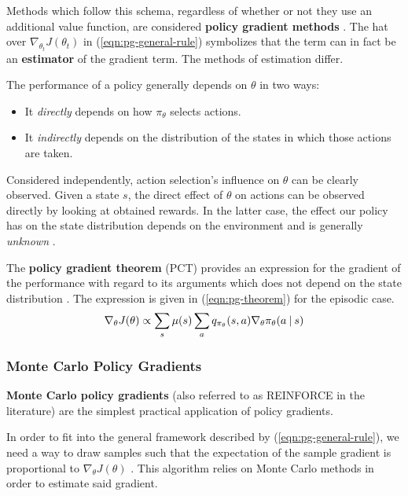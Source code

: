 Methods which follow this schema, regardless of whether or not they use an additional value function, are considered \textbf{policy gradient methods} \cite{rlai}.
The hat over $\nabla_{\theta_{t}} J(\theta_{t})$ in (\ref{eqn:pg-general-rule}) symbolizes that the term can in fact be an \textbf{estimator} of the gradient term. The methods of estimation differ.

The performance of a policy generally depends on $\theta$ in two ways:
\begin{itemize}
    \item It \emph{directly} depends on how $\pi_{\theta}$ selects actions.
    \item It \emph{indirectly} depends on the distribution of the states in which those actions are taken.
\end{itemize}
Considered independently, action selection's influence on $\theta$ can be clearly observed.
Given a state $s$, the direct effect of $\theta$ on actions can be observed directly by looking at obtained rewards.
In the latter case, the effect our policy has on the state distribution depends on the environment and is generally \emph{unknown} \cite{rlai}.

The \textbf{policy gradient theorem} (PCT) provides an expression for the gradient of the performance with regard to its arguments which does not depend on the state distribution \cite{rlai}.
The expression is given in (\ref{eqn:pg-theorem}) for the episodic case.
\begin{equation} \label{eqn:pg-theorem}
    \nabla_{\theta} J(\theta) \propto
        \sum_{s}{
            \mu(s) \sum_{a}{
                q_{\pi_{\theta}}(s, a) \nabla_{\theta} \pi_{\theta}(a \:\vert\: s)
            }
        }
\end{equation}

\subsubsection{Monte Carlo Policy Gradients}
\textbf{Monte Carlo policy gradients} (also referred to as REINFORCE in the literature) are the simplest practical application of policy gradients.

In order to fit into the general framework described by (\ref{eqn:pg-general-rule}), we need a way to draw samples such that the expectation of the sample gradient is proportional to $\nabla_{\theta} J(\theta)$ \cite{rlai}.
This algorithm relies on Monte Carlo methods in order to estimate said gradient.


